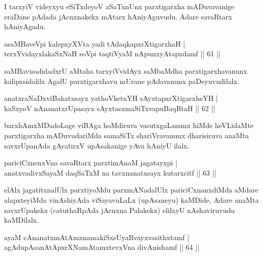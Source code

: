 \begin{artha} 
I tarxyiV videyxyu eSiTxdeyoV aSaTxnUnx parxtigarxha mADuvavanige 
eraDane pAdada jAcnxnakekx mAtarx hAniyAguvudu. Adare savaRtarx 
hAniyAgadu.
\end{artha}

\begin{shl}
asaMBaveV\s pi kalepxyXVta yadi tAdaqkapxrXtigarxhaH | \\
terxYvidayxlakaSxNaH soV\s pi taqtiVyaM nA\s \s punxyAtapxdamf \hfill ||  61 || 
\end{shl}

\begin{artha} 
saMBavisadidadxrU aMtaha tarxyiVvidAyx saMbaMdha parxtigarxhavanunx 
kalipxsidalilx AgalU parxtigarxhavu mUrane pAdavanunx paDeyuvudilalx.
\end{artha}


\begin{shl}
anatxraNaDxviBakatxsayx yathoVketxYH sAyxtapxrXtigarxheYH | \\
kaSxyoV nAnanatxrUpasayx sAyxtasxmaSiTxvapuBaqRtaH \hfill||  62 || 
\end{shl}

\begin{artha} 
barxhAmxMDadoLage viBAga hoMdiruva vasutxgaLanunx hiMde heVLidaMte 
parxtigarxha mADuvudariMda samaSiTx shariVravanunx dharisiruva anaMta 
savxrUpanAda gAyatirxV upAsakanige yAva hAniyU ilalx.
\end{artha}


\begin{shl}
pariciCxnenxVna savaRtarx parxtimAnaM jagatayxpi | \\
anatxvadivxSayaM daqSaTxM na tavxnanatxsayx kutarxcitf \hfill||  63 || 
\end{shl}

\begin{artha} 
elAlx jagatitxnalUlx parxtiyoMdu parxmANadalUlx pariciCxnanxdiMda 
aMdare alapxteyiMda vinAshiyAda viSayavuLaLx (upAsaneyu) kaMDide, 
Adare anaMta savxrUpakekx (catuthaRpAda jAcnxna Palakekx) elilxyU 
nAshaviruvudu kaMDilalx.
\end{artha}


\begin{shl}
ayaM cAnanatxmAtAmxnamakiSxsUyaRvayxvasithxtamf  | \\
agAdupAsanAtApxrXNamAtamxtevxVna divAnishamf \hfill||  64 || 
\end{shl}

